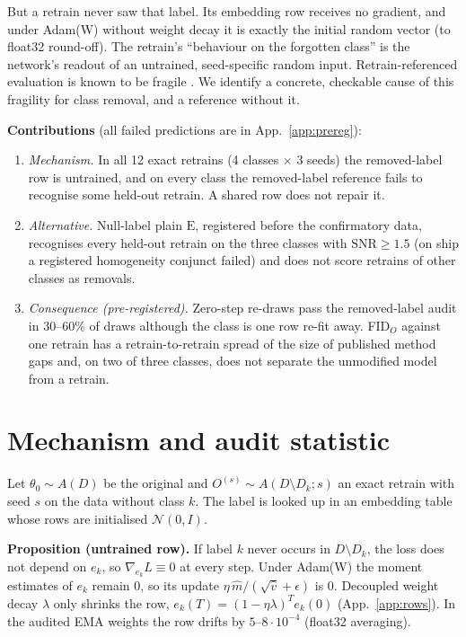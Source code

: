 \documentclass[10pt]{article}
\newcommand{\E}{\mathrm{E}}
\begin{document}
But a retrain never saw that label. Its embedding row receives no gradient, and under Adam(W) without weight decay it is exactly the initial random vector (to float32 round-off). The retrain's ``behaviour on the forgotten class'' is the network's readout of an untrained, seed-specific random input. Retrain-referenced evaluation is known to be fragile \citep{hayes2024,triantafillou2024,georgiev2025,lanyon2025,ebrahimpour2025,kim2026}. We identify a concrete, checkable cause of this fragility for class removal, and a reference without it.

\textbf{Contributions} (all failed predictions are in App.~\ref{app:prereg}):
\begin{enumerate}
\item \emph{Mechanism.} In all 12 exact retrains (4 classes $\times$ 3 seeds) the removed-label row is untrained, and on every class the removed-label reference fails to recognise some held-out retrain. A shared row does not repair it.
\item \emph{Alternative.} Null-label plain $\E$, registered before the confirmatory data, recognises every held-out retrain on the three classes with $\mathrm{SNR}\ge1.5$ (on ship a registered homogeneity conjunct failed) and does not score retrains of other classes as removals.
\item \emph{Consequence (pre-registered).} Zero-step re-draws pass the removed-label audit in 30--60\% of draws although the class is one row re-fit away. FID$_O$ against one retrain has a retrain-to-retrain spread of the size of published method gaps and, on two of three classes, does not separate the unmodified model from a retrain.
\end{enumerate}

\section{Mechanism and audit statistic}
Let $\theta_0\sim A(D)$ be the original and $O^{(s)}\sim A(D\setminus D_k;s)$ an exact retrain with seed $s$ on the data without class $k$. The label is looked up in an embedding table whose rows are initialised $\mathcal N(0,I)$.

\textbf{Proposition (untrained row).} If label $k$ never occurs in $D\setminus D_k$, the loss does not depend on $e_k$, so $\nabla_{e_k}L\equiv0$ at every step. Under Adam(W) the moment estimates of $e_k$ remain $0$, so its update $\eta\,\hat m/(\sqrt{\hat v}+\epsilon)$ is $0$. Decoupled weight decay $\lambda$ only shrinks the row, $e_k(T)=(1-\eta\lambda)^Te_k(0)$ (App.~\ref{app:rows}). In the audited EMA weights the row drifts by $5$--$8\cdot10^{-4}$ (float32 averaging).
\end{document}
